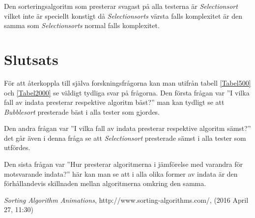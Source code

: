 \documentclass[a4paper]{article}
\begin{document}
Den sorteringsalgoritm som presterar svagast på alla testerna är \emph{Selectionsort} vilket inte är speciellt konstigt då \emph{Selectionsorts} värsta falls komplexitet är den samma som \emph{Selectionsorts} normal falls komplexitet. 

\section{Slutsats}
För att återkoppla till själva forskningsfrågorna kan man utifrån tabell \ref{Tabel500} och \ref{Tabel2000} se väldigt tydliga svar på frågorna. Den första frågan var ''I vilka fall av indata presterar respektive algoritm bäst?'' man kan tydligt se att \emph{Bubblesort} presterade bäst i alla tester som gjordes.

Den andra frågan var ''I vilka fall av indata presterar respektive algoritm sämst?'' det går även i denna fråga se att \emph{Selectionsort} presterade sämst i alla tester som utfördes.

Den sista frågan var ''Hur presterar algoritmerna i jämförelse med varandra för motsvarande indata?'' här kan man se att i alla olika former av indata är den förhållandevis skillnaden mellan algoritmerna omkring den samma.

\begin{thebibliography}{99}
	 \emph{Sorting Algorithm Animations}, http://www.sorting-algorithms.com/, (2016 April 27, 11:30)
\end{thebibliography}
\end{document}
